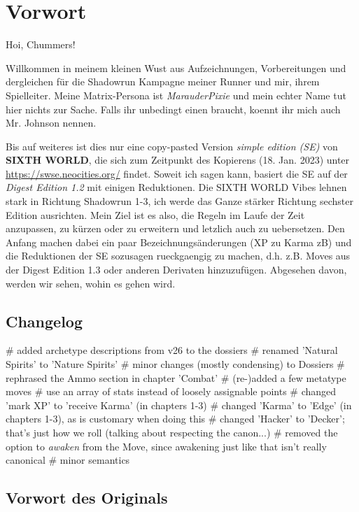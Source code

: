 \chapter{Vorwort}

Hoi, Chummers!

Willkommen in meinem kleinen Wust aus Aufzeichnungen, Vorbereitungen und dergleichen für die Shadowrun Kampagne meiner Runner und mir, ihrem Spielleiter. Meine Matrix-Persona ist \textit{MarauderPixie} und mein echter Name tut hier nichts zur Sache. Falls ihr unbedingt einen braucht, koennt ihr mich auch Mr. Johnson nennen.

Bis auf weiteres ist dies nur eine copy-pasted Version \textit{simple edition (SE)} von \textbf{SIXTH WORLD}, die sich zum Zeitpunkt des Kopierens (18. Jan. 2023) unter \url{https://swse.neocities.org/} findet. Soweit ich sagen kann, basiert die SE auf der \textit{Digest Edition 1.2} mit einigen Reduktionen. Die SIXTH WORLD Vibes lehnen stark in Richtung Shadowrun 1-3, ich werde das Ganze stärker Richtung sechster Edition ausrichten. Mein Ziel ist es also, die Regeln im Laufe der Zeit anzupassen, zu kürzen oder zu erweitern und letzlich auch zu uebersetzen. Den Anfang machen dabei ein paar Bezeichnungsänderungen (XP zu Karma zB) und die Reduktionen der SE sozusagen rueckgaengig zu machen, d.h. z.B. Moves aus der Digest Edition 1.3 oder anderen Derivaten hinzuzufügen. Abgesehen davon, werden wir sehen, wohin es gehen wird. 

\section{Changelog}

\begin{easylist}
# added archetype descriptions from v26 to the dossiers
# renamed 'Natural Spirits' to 'Nature Spirits'
# minor changes (mostly condensing) to Dossiers
# rephrased the Ammo section in chapter 'Combat'
# (re-)added a few metatype moves
# use an array of stats instead of loosely assignable points
# changed 'mark XP' to 'receive Karma' (in chapters 1-3)
# changed 'Karma' to 'Edge' (in chapters 1-3), as is customary when doing this
# changed 'Hacker' to 'Decker'; that's just how we roll (talking about respecting the canon...)
# removed the option to \textit{awaken} from the  Move, since awakening just like that isn't really canonical
# minor semantics
\end{easylist}


\section{Vorwort des Originals}

